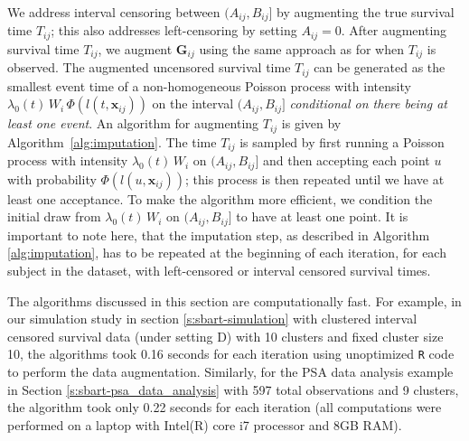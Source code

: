 \documentclass[11pt]{article}
\begin{document}
We address interval censoring between $(A_{ij}, B_{ij}]$ by augmenting the true survival time $T_{ij}$; this also addresses left-censoring by setting $A_{ij} = 0$. After augmenting survival time $T_{ij}$, we augment $\mathbf G_{ij}$ using the same approach as for when $T_{ij}$ is observed. The augmented uncensored survival time $T_{ij}$ can be generated as the smallest event time of a non-homogeneous Poisson process with intensity $\lambda_0(t) \, W_i \, \Phi(l(t, \mathbf x_{ij}))$ on the interval $(A_{ij}, B_{ij}]$ \emph{conditional on there being at least one event}. An algorithm for augmenting $T_{ij}$ is given by Algorithm~\ref{alg:imputation}. The time $T_{ij}$ is sampled by first running a Poisson process with intensity $\lambda_0(t) \, W_i$ on $(A_{ij}, B_{ij}]$ and then accepting each point $u$ with probability $\Phi(l(u, \mathbf x_{ij}))$; this process is then repeated until we have at least one acceptance. To make the algorithm more efficient, we condition the initial draw from $\lambda_0(t) \, W_i$ on $(A_{ij}, B_{ij}]$ to have at least one point. It is important to note here, that the imputation step, as described in Algorithm \ref{alg:imputation}, has to be repeated at the beginning of each iteration, for each subject in the dataset, with left-censored or interval censored survival times.

The algorithms discussed in this section are computationally fast. For example, in our simulation study in section \ref{s:sbart-simulation} with  clustered interval censored survival data (under setting D) with 10 clusters and fixed cluster size 10, the algorithms took 0.16 seconds for each iteration using unoptimized \texttt{R} code to perform the data augmentation. Similarly, for the PSA data analysis example in Section \ref{s:sbart-psa_data_analysis} with  597 total observations and 9 clusters,  the algorithm took only 0.22 seconds for each iteration (all computations were performed on a laptop with Intel(R) core i7 processor and 8GB RAM).
\end{document}
